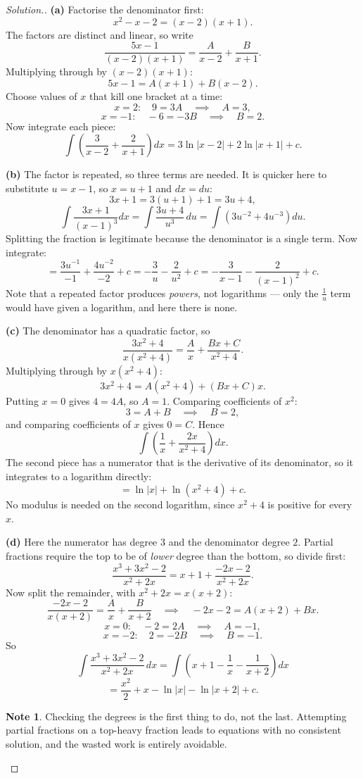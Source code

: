 \documentclass[11pt,a4paper]{article}
\theoremstyle{definition}
\newtheorem{note}[thm]{Note}
\newenvironment{solution}
  {\renewcommand{\qedsymbol}{}\begin{proof}[\textit{Solution}.]}
  {\end{proof}}
\begin{document}
\begin{solution}
\textbf{(a)} Factorise the denominator first:
$$x^2-x-2=(x-2)(x+1).$$
The factors are distinct and linear, so write
$$\frac{5x-1}{(x-2)(x+1)}=\frac{A}{x-2}+\frac{B}{x+1}.$$
Multiplying through by $(x-2)(x+1)$:
$$5x-1=A(x+1)+B(x-2).$$
Choose values of $x$ that kill one bracket at a time:
$$x=2:\quad 9=3A\quad\implies\quad A=3,$$
$$x=-1:\quad -6=-3B\quad\implies\quad B=2.$$
Now integrate each piece:
$$\int\left(\frac{3}{x-2}+\frac{2}{x+1}\right)dx=3\ln|x-2|+2\ln|x+1|+c.$$

\textbf{(b)} The factor is repeated, so three terms are needed. It is quicker here to
substitute $u=x-1$, so $x=u+1$ and $dx=du$:
$$3x+1=3(u+1)+1=3u+4,$$
$$\int\frac{3x+1}{(x-1)^3}dx=\int\frac{3u+4}{u^3}\,du
=\int\left(3u^{-2}+4u^{-3}\right)du.$$
Splitting the fraction is legitimate because the denominator is a single term. Now
integrate:
$$=\frac{3u^{-1}}{-1}+\frac{4u^{-2}}{-2}+c=-\frac{3}{u}-\frac{2}{u^2}+c
=-\frac{3}{x-1}-\frac{2}{(x-1)^2}+c.$$
Note that a repeated factor produces \emph{powers}, not logarithms --- only the
$\frac{1}{u}$ term would have given a logarithm, and here there is none.

\textbf{(c)} The denominator has a quadratic factor, so
$$\frac{3x^2+4}{x\left(x^2+4\right)}=\frac{A}{x}+\frac{Bx+C}{x^2+4}.$$
Multiplying through by $x\left(x^2+4\right)$:
$$3x^2+4=A\left(x^2+4\right)+(Bx+C)x.$$
Putting $x=0$ gives $4=4A$, so $A=1$. Comparing coefficients of $x^2$:
$$3=A+B\quad\implies\quad B=2,$$
and comparing coefficients of $x$ gives $0=C$. Hence
$$\int\left(\frac{1}{x}+\frac{2x}{x^2+4}\right)dx.$$
The second piece has a numerator that is the derivative of its denominator, so it
integrates to a logarithm directly:
$$=\ln|x|+\ln\left(x^2+4\right)+c.$$
No modulus is needed on the second logarithm, since $x^2+4$ is positive for every $x$.

\textbf{(d)} Here the numerator has degree $3$ and the denominator degree $2$. Partial
fractions require the top to be of \emph{lower} degree than the bottom, so divide first:
$$\frac{x^3+3x^2-2}{x^2+2x}=x+1+\frac{-2x-2}{x^2+2x}.$$
Now split the remainder, with $x^2+2x=x(x+2)$:
$$\frac{-2x-2}{x(x+2)}=\frac{A}{x}+\frac{B}{x+2}\quad\implies\quad -2x-2=A(x+2)+Bx.$$
$$x=0:\quad -2=2A\quad\implies\quad A=-1,$$
$$x=-2:\quad 2=-2B\quad\implies\quad B=-1.$$
So
$$\int\frac{x^3+3x^2-2}{x^2+2x}\,dx=\int\left(x+1-\frac{1}{x}-\frac{1}{x+2}\right)dx$$
$$=\frac{x^2}{2}+x-\ln|x|-\ln|x+2|+c.$$

\begin{note}
Checking the degrees is the first thing to do, not the last. Attempting partial
fractions on a top-heavy fraction leads to equations with no consistent solution, and
the wasted work is entirely avoidable.
\end{note}
\end{solution}
\end{document}
